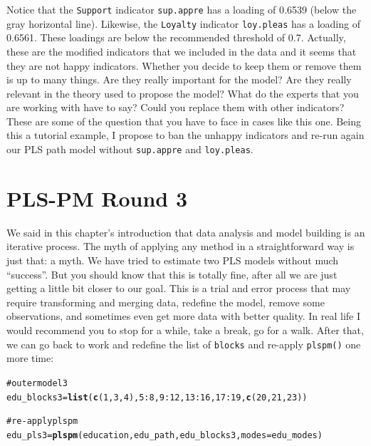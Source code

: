 \documentclass[12pt]{book}\usepackage{graphicx, color}
\makeatletter
\newcommand{\hlfunctioncall}[1]{\textcolor[rgb]{0.501960784313725,0,0.329411764705882}{\textbf{#1}}}%
\newcommand{\hlcomment}[1]{\textcolor[rgb]{0.180392156862745,0.6,0.341176470588235}{#1}}%
\newenvironment{kframe}{%
 \def\at@end@of@kframe{}%
 \ifinner\ifhmode%
  \def\at@end@of@kframe{\end{minipage}}%
  \begin{minipage}{\columnwidth}%
 \fi\fi%
 \def\FrameCommand##1{\hskip\@totalleftmargin \hskip-\fboxsep
 \colorbox{shadecolor}{##1}\hskip-\fboxsep
     \hskip-\linewidth \hskip-\@totalleftmargin \hskip\columnwidth}%
 \MakeFramed {\advance\hsize-\width
   \@totalleftmargin\z@ \linewidth\hsize
   \@setminipage}}%
 {\par\unskip\endMakeFramed%
 \at@end@of@kframe}
\newenvironment{knitrout}{}{} %
\newcommand{\fplspm}{\texttt{plspm()}}
\newcommand{\code}[1]{\texttt{#1}}
\makeatother
\begin{document}
Notice that the \code{Support} indicator \code{sup.appre} has a loading of 0.6539 (below the gray horizontal line). Likewise, the \code{Loyalty} indicator \code{loy.pleas} has a loading of 0.6561. These loadings are below the recommended threshold of 0.7. Actually, these are the modified indicators that we included in the data and it seems that they are not happy indicators. Whether you decide to keep them or remove them is up to many things. Are they really important for the model? Are they really relevant in the theory used to propose the model? What do the experts that you are working with have to say? Could you replace them with other indicators? These are some of the question that you have to face in cases like this one. Being this a tutorial example, I propose to ban the unhappy indicators and re-run again our PLS path model without \code{sup.appre} and \code{loy.pleas}.




\section{PLS-PM Round 3}
We said in this chapter's introduction that data analysis and model building is an iterative process. The myth of applying any method in a straightforward way is just that: a myth. We have tried to estimate two PLS models without much ``success''. But you should know that this is totally fine, after all we are just getting a little bit closer to our goal. This is a trial and error process that may require transforming and merging data, redefine the model, remove some observations, and sometimes even get more data with better quality. In real life I would recommend you to stop for a while, take a break, go for a walk. After that, we can go back to work and redefine the list of \code{blocks} and re-apply \fplspm{} one more time:
\begin{knitrout}
\color{fgcolor}\begin{kframe}
\begin{alltt}
\hlcomment{# outer model 3}
edu_blocks3 = \hlfunctioncall{list}(\hlfunctioncall{c}(1, 3, 4), 5:8, 9:12, 13:16, 17:19, \hlfunctioncall{c}(20, 21, 23))

\hlcomment{# re-apply plspm}
edu_pls3 = \hlfunctioncall{plspm}(education, edu_path, edu_blocks3, modes = edu_modes)
\end{alltt}
\end{kframe}
\end{knitrout}
\end{document}
